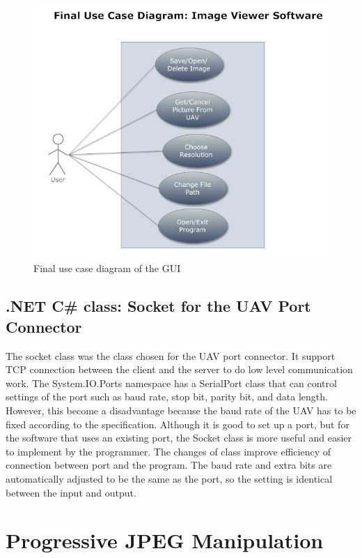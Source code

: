 \begin{figure}[!hbtp]
\begin{center}
\includegraphics[scale=0.7]{figures/FinaluserCase.PNG} 
\end{center}
\caption{Final use case diagram of the GUI\label{GUI_finalUseCase}}
\end{figure}

\subsection{.NET C\# class: Socket for the UAV Port Connector}
The socket class was the class chosen for the UAV port connector. It support TCP connection between the client and the server to do low level communication work\cite{xiaX}. The System.IO.Ports namespace has a SerialPort class that can control settings of the port such as baud rate, stop bit, parity bit, and data length. However, this become a disadvantage because the baud rate of the UAV has to be fixed according to the specification. Although it is good to set up a port, but for the software that uses an existing port, the Socket class is more useful and easier to implement by the programmer. The changes of class improve efficiency of connection between port and the program. The baud rate and extra bits are automatically adjusted to be the same as the port, so the setting is identical between the input and output. 

\section{Progressive JPEG Manipulation}

